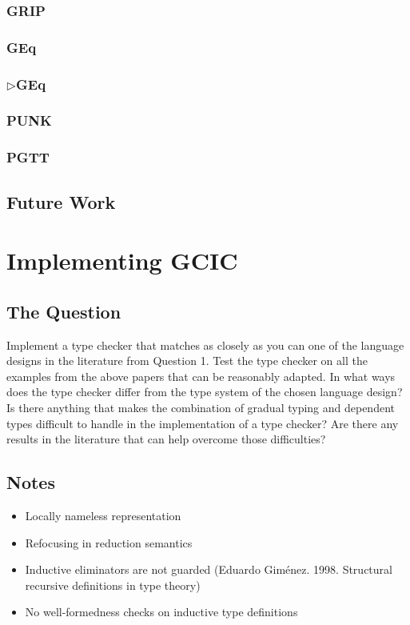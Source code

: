 \documentclass{article}
\newcommand{\GGEq}[0]{\(\triangleright\)GEq}
\begin{document}
\subsubsection{GRIP}
\subsubsection{GEq}
\subsubsection{\GGEq{}}
\subsubsection{PUNK}
\subsubsection{PGTT}

\subsection{Future Work}\label{subsec:future}

\section{Implementing GCIC}

\subsection{The Question}
Implement a type checker that matches as closely as you can one of the language
designs in the literature from Question 1. Test the type checker on all the
examples from the above papers that can be reasonably adapted. In what ways does
the type checker differ from the type system of the chosen language design? Is
there anything that makes the combination of gradual typing and dependent types
difficult to handle in the implementation of a type checker? Are there any
results in the literature that can help overcome those difficulties?

\subsection{Notes}
\begin{itemize}
  \item Locally nameless representation \cite{chargueraud_locally_2012}
  \item Refocusing in reduction semantics \cite{danvy_refocusing_2004}
  \item Inductive eliminators are not guarded (Eduardo Giménez. 1998. Structural
    recursive definitions in type theory)
  \item No well-formedness checks on inductive type definitions
\end{itemize}
\end{document}
